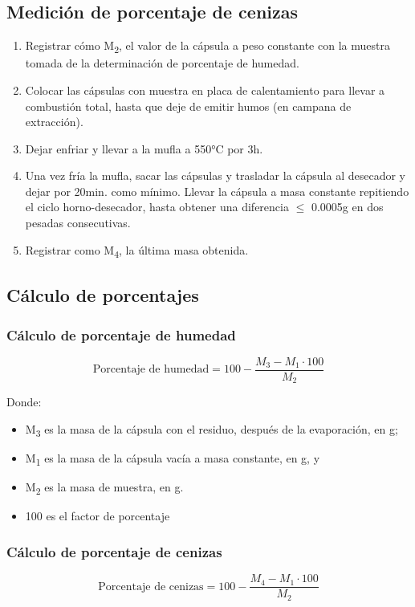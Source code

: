 \subsection{Medición de porcentaje de cenizas}
\begin{enumerate}
    \item Registrar cómo M\textsubscript{2}, el valor de la cápsula a peso constante con la muestra tomada de la determinación de porcentaje de humedad.
    \item Colocar las cápsulas con muestra en placa de calentamiento para llevar a combustión total, hasta que deje de emitir humos (en campana de extracción).
    \item Dejar enfriar y llevar a la mufla a 550°C por 3h.
    \item Una vez fría la mufla, sacar las cápsulas y trasladar la cápsula al desecador y dejar por 20min. como mínimo. Llevar la cápsula a masa constante repitiendo el ciclo horno-desecador, hasta obtener una diferencia $\leq$ 0.0005g en dos pesadas consecutivas.
    \item Registrar como M\textsubscript{4}, la última masa obtenida.
\end{enumerate}

\subsection{Cálculo de porcentajes}

\subsubsection{Cálculo de porcentaje de humedad}
\begin{equation*}
    \text{Porcentaje de humedad} = 100 - \frac{M_{3} - M_{1} \cdot 100}{M_{2}}
\end{equation*}

Donde: 
\begin{itemize}
    \item M\textsubscript{3} es la masa de la cápsula con el residuo, después de la evaporación, en g;
    \item M\textsubscript{1} es la masa de la cápsula vacía a masa constante, en g, y
    \item M\textsubscript{2} es la masa de muestra, en g.
    \item 100 es el factor de porcentaje
\end{itemize}


\subsubsection{Cálculo de porcentaje de cenizas}
\begin{equation*}
    \text{Porcentaje de cenizas} = 100 - \frac{M_{4} - M_{1} \cdot 100}{M_{2}}
\end{equation*}

